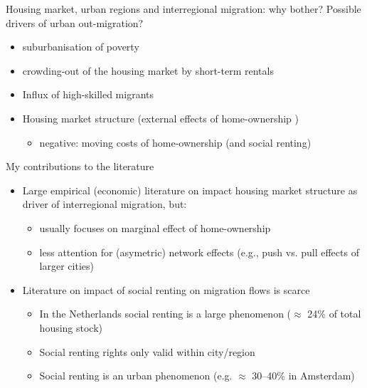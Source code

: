 \documentclass{beamer}
\begin{document}
\begin{frame}{Housing market, urban regions and interregional migration: why bother?}
	Possible \alert{drivers} of urban out-migration?
	  \begin{itemize}
		\item \alert{suburbanisation} of poverty \citep{hochstenbach2018gentrification}
		\item \alert{crowding-out} of the housing market by short-term rentals
		  \citep{koster2021short}
		\item \alert{Influx} of high-skilled migrants
		  \citep{beckers2019residential}
   		\item \alert{Housing market structure} (external effects of home-ownership \citet{dietz2003social})
   		\begin{itemize}
   			\item \alert{negative}: moving costs of home-ownership (and social renting) \citep{oswald1996conjecture,oswald1999housing}
   		\end{itemize}
  \end{itemize}
\end{frame}



\begin{frame}{My contributions to the literature}
  \begin{itemize}
  \item Large empirical (economic) literature on impact housing market structure as driver of interregional migration, but:
    \begin{itemize}
    \item usually focuses on \alert{marginal} effect of home-ownership
    \item less attention for (asymetric) network effects (e.g., push vs. pull effects of larger cities)\newline
    \end{itemize}
  \item Literature on impact of social renting on migration flows is
    scarce \footnotesize{\citep{de2009homeownership} }
	\begin{itemize}
        \item In the Netherlands social renting is a large phenomenon
          ($\approx$ 24\% of total housing stock)
        \item Social renting rights only valid \alert{within} city/region
        \item Social renting is an \alert{urban} phenomenon (e.g. $\approx$
          30--40\% in Amsterdam) 
        \end{itemize}
\end{itemize}
\end{frame}
\end{document}
